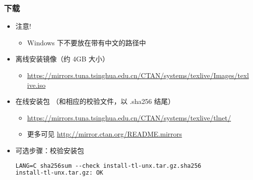\begin{frame}[fragile]
  \frametitle{下载}
  \begin{itemize}
    \item 注意!
      \begin{itemize}
        \item Windows 下不要放在带有中文的路径中
      \end{itemize}
    \item 离线安装镜像（约 4GB 大小）
      \begin{itemize}
        \item {\footnotesize
          \url{https://mirrors.tuna.tsinghua.edu.cn/CTAN/systems/texlive/Images/texlive.iso}}
      \end{itemize}
    \item 在线安装包 （和相应的校验文件，以 .sha256 结尾）
      \begin{itemize} %
        \item {\footnotesize
          \url{https://mirrors.tuna.tsinghua.edu.cn/CTAN/systems/texlive/tlnet/}
        }
        \item 更多可见 \url{http://mirror.ctan.org/README.mirrors}
      \end{itemize}

    \item 可选步骤：校验安装包
      \begin{lstlisting}[language=tex]
LANG=C sha256sum --check install-tl-unx.tar.gz.sha256
install-tl-unx.tar.gz: OK
      \end{lstlisting}

  \end{itemize}
\end{frame}

